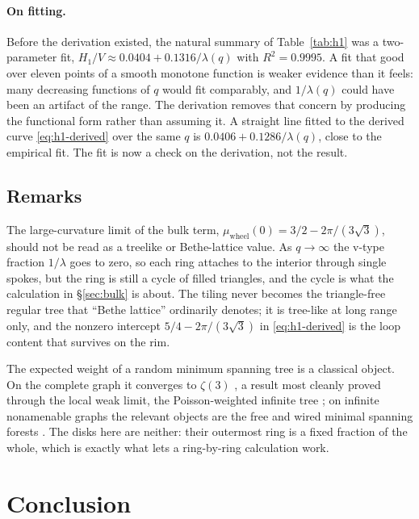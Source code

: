 \documentclass[11pt]{article}
\begin{document}
\paragraph{On fitting.} Before the derivation existed, the natural summary of Table~\ref{tab:h1} was a two-parameter fit, $H_1/V\approx0.0404+0.1316/\lambda(q)$ with $R^2=0.9995$. A fit that good over eleven points of a smooth monotone function is weaker evidence than it feels: many decreasing functions of $q$ would fit comparably, and $1/\lambda(q)$ could have been an artifact of the range. The derivation removes that concern by producing the functional form rather than assuming it. A straight line fitted to the derived curve \eqref{eq:h1-derived} over the same $q$ is $0.0406+0.1286/\lambda(q)$, close to the empirical fit. The fit is now a check on the derivation, not the result.

\subsection{Remarks}
\label{sec:remarks}

The large-curvature limit of the bulk term, $\mu_{\mathrm{wheel}}(0)=3/2-2\pi/(3\sqrt3)$, should not be read as a treelike or Bethe-lattice value. As $q\to\infty$ the v-type fraction $1/\lambda$ goes to zero, so each ring attaches to the interior through single spokes, but the ring is still a cycle of filled triangles, and the cycle is what the calculation in \S\ref{sec:bulk} is about. The tiling never becomes the triangle-free regular tree that ``Bethe lattice'' ordinarily denotes; it is tree-like at long range only, and the nonzero intercept $5/4-2\pi/(3\sqrt3)$ in \eqref{eq:h1-derived} is the loop content that survives on the rim.

The expected weight of a random minimum spanning tree is a classical object. On the complete graph it converges to $\zeta(3)$ \citep{frieze1985}, a result most cleanly proved through the local weak limit, the Poisson-weighted infinite tree \citep{aldous2004}; on infinite nonamenable graphs the relevant objects are the free and wired minimal spanning forests \citep{lyons2006}. The disks here are neither: their outermost ring is a fixed fraction of the whole, which is exactly what lets a ring-by-ring calculation work.

\section{Conclusion}
\label{sec:conclusion}
\end{document}
